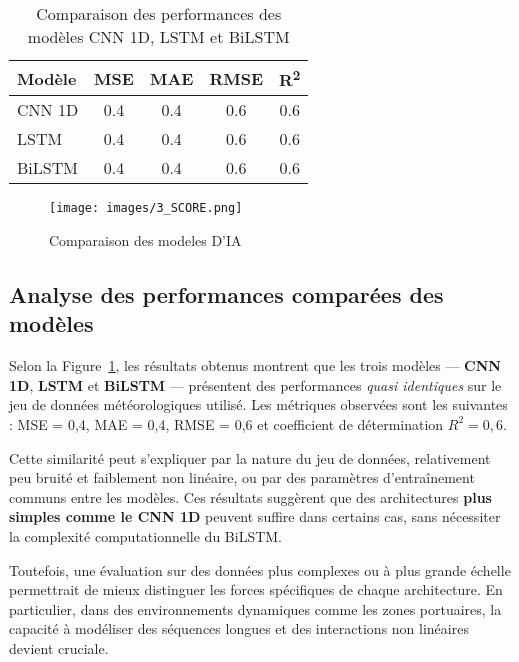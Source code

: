 \documentclass[a4paper,12pt,openany]{report}
\begin{document}
	\begin{table}[H]
		\centering
		\caption{Comparaison des performances des modèles CNN 1D, LSTM et BiLSTM}
		\begin{tabular}{|l|c|c|c|c|}
			\toprule
			\textbf{Modèle} & \textbf{MSE} & \textbf{MAE} & \textbf{RMSE} & \textbf{R\textsuperscript{2}} \\
			\midrule
			CNN 1D  & 0.4 & 0.4 & 0.6 & 0.6 \\
			\hline
			LSTM    & 0.4 & 0.4 & 0.6 & 0.6 \\
			\hline
			BiLSTM  & 0.4 & 0.4 & 0.6 & 0.6 \\
			\bottomrule
		\end{tabular}
		\label{tab:comparison_models}
	\end{table}
	\begin{figure}[H]
		\begin{center}
		 \begin{minipage}{\textwidth}
		    \begin{center}
		    \texttt{[image: images/3\_SCORE.png]}
		    \end{center}
		    \end{minipage}

			\caption{Comparaison des modeles D'IA\label{Fig 3.5}}
		\end{center}
	\end{figure}
	
\subsection{Analyse des performances comparées des modèles}

\quad Selon la Figure~\ref{Fig 3.5}, les résultats obtenus montrent que les trois modèles — \textbf{CNN 1D}, \textbf{LSTM} et \textbf{BiLSTM} — présentent des performances \emph{quasi identiques} sur le jeu de données météorologiques utilisé. Les métriques observées sont les suivantes : MSE = 0{,}4, MAE = 0{,}4, RMSE = 0{,}6 et coefficient de détermination \( R^2 = 0{,}6 \).

\quad Cette similarité peut s’expliquer par la nature du jeu de données, relativement peu bruité et faiblement non linéaire, ou par des paramètres d'entraînement communs entre les modèles. Ces résultats suggèrent que des architectures \textbf{plus simples comme le CNN 1D} peuvent suffire dans certains cas, sans nécessiter la complexité computationnelle du BiLSTM.

\quad Toutefois, une évaluation sur des données plus complexes ou à plus grande échelle permettrait de mieux distinguer les forces spécifiques de chaque architecture. En particulier, dans des environnements dynamiques comme les zones portuaires, la capacité à modéliser des séquences longues et des interactions non linéaires devient cruciale.
\end{document}
